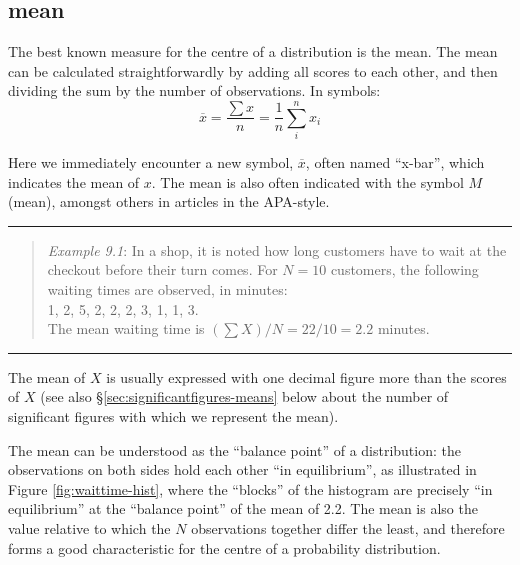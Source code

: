 \documentclass[
]{book}
\begin{document}
\hypertarget{sec:mean}{%
\subsection{mean}\label{sec:mean}}

The best known measure for the centre of a distribution is the
mean. The mean can be calculated straightforwardly by adding
all scores to each other, and then dividing the sum by the
number of observations. In symbols:
\begin{equation} 
  \overline{x} = \frac{\sum x}{n} = \frac{1}{n} \sum\limits_{i}^n x_i
  \label{eq:average}
\end{equation}

Here we immediately encounter a new symbol, \(\overline{x}\), often
named ``x-bar'', which indicates the mean of \(x\). The mean
is also often indicated with the symbol \(M\) (mean), amongst others
in articles in the APA-style.

\begin{center}\rule{0.5\linewidth}{0.5pt}\end{center}

\begin{quote}
\emph{Example 9.1}: In
a shop, it is noted how long customers have to wait
at the checkout before their turn comes. For \(N=10\) customers,
the following waiting times are observed, in minutes:\\
1, 2, 5, 2, 2, 2, 3, 1, 1, 3.\\
The mean waiting time is \((\sum X)/N = 22/10 = 2.2\) minutes.
\end{quote}

\begin{center}\rule{0.5\linewidth}{0.5pt}\end{center}

The mean of \(X\) is usually expressed with one decimal figure more than
the scores of \(X\) (see also §\ref{sec:significantfigures-means} below about the number of significant
figures with which we represent the mean).

The mean can be understood as the ``balance point'' of a distribution:
the observations on both sides hold each other ``in equilibrium'', as
illustrated in Figure \ref{fig:waittime-hist}, where the ``blocks''
of the histogram are precisely ``in equilibrium'' at the ``balance point''
of the mean of 2.2. The mean is also the value relative to which the
\(N\) observations together differ the least, and therefore forms a good
characteristic for the centre of a probability distribution.
\end{document}

